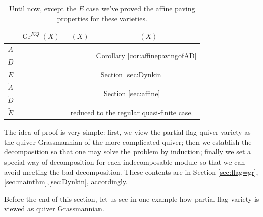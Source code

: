 \documentclass[reqno,11pt]{amsart}
\numberwithin{equation}{section}
\theoremstyle{plain}
\theoremstyle{plain}
\numberwithin{equation}{section}
\theoremstyle{remark}
\DeclareMathOperator{\Flagd}{\operatorname{Flag}_{\mathbf{d}}}
\DeclareMathOperator{\Flagdstr}{\operatorname{Flag}_{\mathbf{d},str}}
\newcommand{\Grq}{\operatorname{Gr}^{KQ}}
\begin{document}
\begin{table}\label{table:result}
\begin{tabular}{|c|c|c|c|}
\hline
            & $\Grq(X)$                  & $\Flagd(X)$                          & $\Flagdstr(X)$          \\ \hline
$A$         & \multirow{3}{*}{\cite[Section 5]{irelli2019cell}} & \multirow{2}{*}{\cite[Theorem 2.20]{maksimau2019flag}}        & \multirow{2}{*}{Corollary \ref{cor:affinepavingofAD}}       \\ \cline{1-1}
$D$         &                            &                                      &                         \\ \cline{1-1} \cline{3-4} 
$E$         &                            & \multicolumn{2}{c|}{Section \ref{sec:Dynkin}}                                          \\ \hline
$\tilde{A}$ & \multirow{3}{*}{\cite[Section 6]{irelli2019cell}} & \multicolumn{2}{c|}{\multirow{2}{*}{Section \ref{sec:affine}}}                         \\ \cline{1-1}
$\tilde{D}$ &                            & \multicolumn{2}{c|}{}                                          \\ \cline{1-1} \cline{3-4} 
$\tilde{E}$ &                            & \multicolumn{2}{c|}{reduced to the regular quasi-finite case.} \\ \hline
\end{tabular}
\caption{Until now, except the $\tilde{E}$ case we've proved the affine paving properties for these varieties.}
\end{table}

The idea of proof is very simple: first, we view the partial flag quiver variety as the quiver Grassmannian of the more complicated quiver; then we establish the decomposition so that one may solve the problem by induction; finally we set a special way of decomposition for each indecomposable module so that we can avoid meeting the bad decomposition. These contents are in Section \ref{sec:flag=gr},\ref{sec:mainthm},\ref{sec:Dynkin}, accordingly.

Before the end of this section, let us see in one example how partial flag variety is viewed as quiver Grassmannian.
\end{document}
